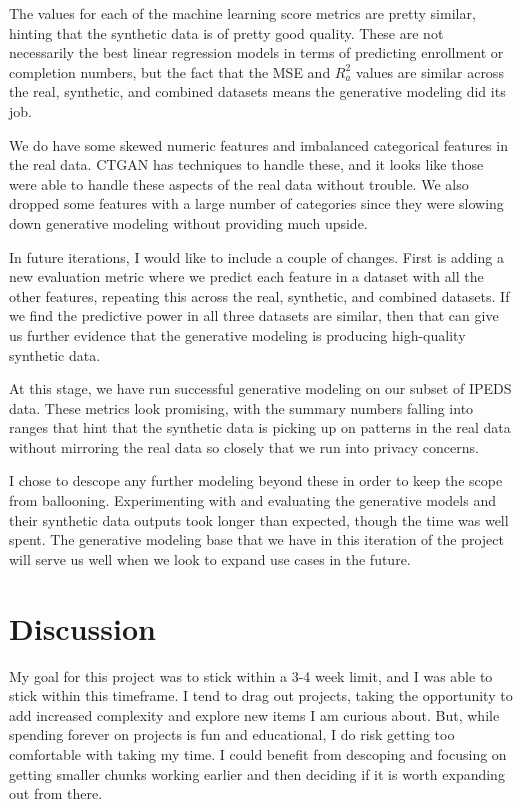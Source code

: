 \documentclass[sigconf, authorversion, nonacm]{acmart}
\begin{document}
    The values for each of the machine learning score metrics are pretty similar, hinting that the synthetic data is of pretty good quality. These are not necessarily the best linear regression models in terms of predicting enrollment or completion numbers, but the fact that the MSE and $R^2_a$ values are similar across the real, synthetic, and combined datasets means the generative modeling did its job.

    We do have some skewed numeric features and imbalanced categorical features in the real data. CTGAN has techniques to handle these, and it looks like those were able to handle these aspects of the real data without trouble. We also dropped some features with a large number of categories since they were slowing down generative modeling without providing much upside.

    In future iterations, I would like to include a couple of changes. First is adding a new evaluation metric where we predict each feature in a dataset with all the other features, repeating this across the real, synthetic, and combined datasets. If we find the predictive power in all three datasets are similar, then that can give us further evidence that the generative modeling is producing high-quality synthetic data.

    At this stage, we have run successful generative modeling on our subset of IPEDS data. These metrics look promising, with the summary numbers falling into ranges that hint that the synthetic data is picking up on patterns in the real data without mirroring the real data so closely that we run into privacy concerns.

    I chose to descope any further modeling beyond these in order to keep the scope from ballooning. Experimenting with and evaluating the generative models and their synthetic data outputs took longer than expected, though the time was well spent. The generative modeling base that we have in this iteration of the project will serve us well when we look to expand use cases in the future.

\section{Discussion}
    My goal for this project was to stick within a 3-4 week limit, and I was able to stick within this timeframe. I tend to drag out projects, taking the opportunity to add increased complexity and explore new items I am curious about. But, while spending forever on projects is fun and educational, I do risk getting too comfortable with taking my time. I could benefit from descoping and focusing on getting smaller chunks working earlier and then deciding if it is worth expanding out from there.
\end{document}
